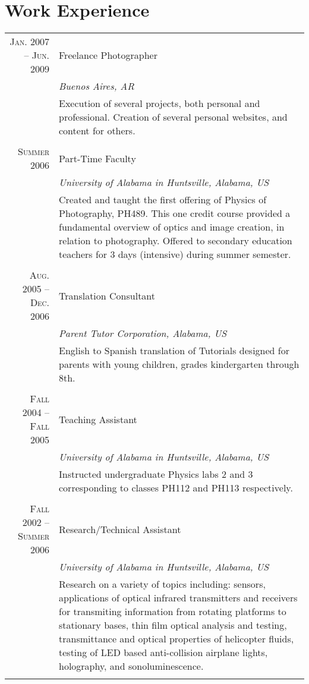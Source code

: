 \documentclass[letterpaper,10pt]{article}
\begin{document}
\section{Work Experience}
\begin{tabular}{r|p{11cm}}
\textsc{Jan. 2007 -- Jun. 2009}		&	Freelance Photographer \\
									&	\emph{Buenos Aires, AR}\\
									&	\footnotesize{Execution of several projects, both personal and professional. Creation of several personal websites, and content for others.}\\
									\multicolumn{2}{c}{} \\

\textsc{Summer 2006}				&	Part-Time Faculty \\
									&	\emph{University of Alabama in Huntsville, Alabama, US}\\
									&	\footnotesize{Created and taught the first offering of Physics of Photography, PH489. This one credit course provided a fundamental overview of optics and image creation, in relation to photography. Offered to secondary education teachers for 3 days (intensive) during summer semester.}\\
									\multicolumn{2}{c}{} \\

\textsc{Aug. 2005 -- Dec. 2006}		&	Translation Consultant\\
									&	\emph{Parent Tutor Corporation, Alabama, US}\\
									&	\footnotesize{English to Spanish translation of Tutorials designed for parents with young children, grades kindergarten through 8th.}\\
									\multicolumn{2}{c}{} \\
									
\textsc{Fall 2004 -- Fall 2005}		&	Teaching Assistant \\
									&	\emph{University of Alabama in Huntsville, Alabama, US}\\
									&	\footnotesize{Instructed undergraduate Physics labs 2 and 3 corresponding to classes PH112 and PH113 respectively.}\\
									\multicolumn{2}{c}{} \\
									
\textsc{Fall 2002 -- Summer 2006}	&	Research/Technical Assistant \\
									&	\emph{University of Alabama in Huntsville, Alabama, US}\\
									&	\footnotesize{Research on a variety of topics including: sensors, applications of optical infrared transmitters and receivers for transmiting information from rotating platforms to stationary bases, thin film optical analysis and testing, transmittance and optical properties of helicopter fluids, testing of LED based anti-collision airplane lights, holography, and sonoluminescence.}\\
									\multicolumn{2}{c}{} \\
									

\end{tabular}
\end{document}
